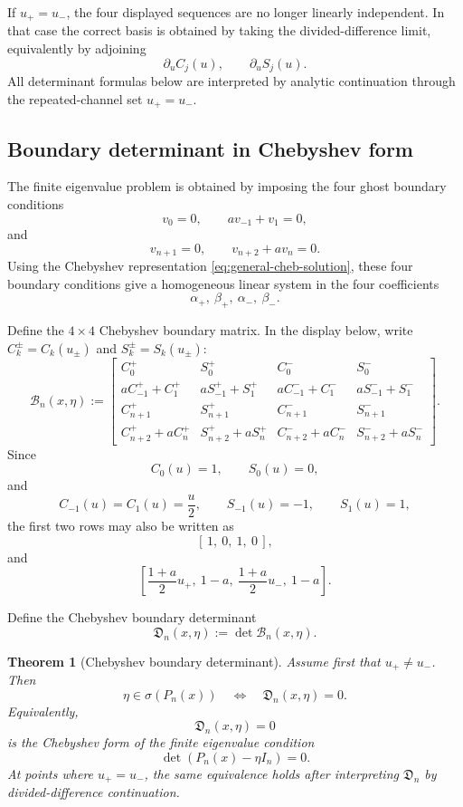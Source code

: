 \documentclass[11pt]{amsart}
\numberwithin{equation}{section}
\newtheorem{theorem}{Theorem}[section]
\begin{document}
If \(u_+=u_-\), the four displayed sequences are no longer linearly
independent.  In that case the correct basis is obtained by taking the
divided-difference limit, equivalently by adjoining
\[
        \partial_u C_j(u),
        \qquad
        \partial_u S_j(u).
\]
All determinant formulas below are interpreted by analytic continuation
through the repeated-channel set \(u_+=u_-\).

\subsection{Boundary determinant in Chebyshev form}

The finite eigenvalue problem is obtained by imposing the four ghost boundary
conditions
\[
        v_0=0,
        \qquad
        av_{-1}+v_1=0,
\]
and
\[
        v_{n+1}=0,
        \qquad
        v_{n+2}+av_n=0.
\]
Using the Chebyshev representation \eqref{eq:general-cheb-solution}, these
four boundary conditions give a homogeneous linear system in the four
coefficients
\[
        \alpha_+,\ \beta_+,\ \alpha_-,\ \beta_-.
\]

Define the \(4\times4\) Chebyshev boundary matrix.  In the display below,
write \(C_k^\pm=C_k(u_\pm)\) and \(S_k^\pm=S_k(u_\pm)\):
\[
        \mathcal B_n(x,\eta)
        :=
        \begin{bmatrix}
        C_0^+ & S_0^+ & C_0^- & S_0^-\\[0.3em]
        aC_{-1}^+ + C_1^+
        &
        aS_{-1}^+ + S_1^+
        &
        aC_{-1}^- + C_1^-
        &
        aS_{-1}^- + S_1^-\\[0.3em]
        C_{n+1}^+ & S_{n+1}^+ & C_{n+1}^- & S_{n+1}^-\\[0.3em]
        C_{n+2}^+ + aC_n^+
        &
        S_{n+2}^+ + aS_n^+
        &
        C_{n+2}^- + aC_n^-
        &
        S_{n+2}^- + aS_n^-
        \end{bmatrix}.
\]
Since
\[
        C_0(u)=1,\qquad S_0(u)=0,
\]
and
\[
        C_{-1}(u)=C_1(u)=\frac u2,
        \qquad
        S_{-1}(u)=-1,\qquad S_1(u)=1,
\]
the first two rows may also be written as
\[
        [\,1,\ 0,\ 1,\ 0\,],
\]
and
\[
        \left[
        \frac{1+a}{2}u_+,\ 1-a,\ \frac{1+a}{2}u_-,\ 1-a
        \right].
\]

Define the Chebyshev boundary determinant
\[
        \mathfrak D_n(x,\eta):=\det \mathcal B_n(x,\eta).
\]

\begin{theorem}[Chebyshev boundary determinant]
Assume first that \(u_+\ne u_-\).  Then
\[
        \eta\in\sigma(P_n(x))
        \quad\Longleftrightarrow\quad
        \mathfrak D_n(x,\eta)=0.
\]
Equivalently,
\[
        \mathfrak D_n(x,\eta)=0
\]
is the Chebyshev form of the finite eigenvalue condition
\[
        \det(P_n(x)-\eta I_n)=0.
\]
At points where \(u_+=u_-\), the same equivalence holds after interpreting
\(\mathfrak D_n\) by divided-difference continuation.
\end{theorem}
\end{document}
